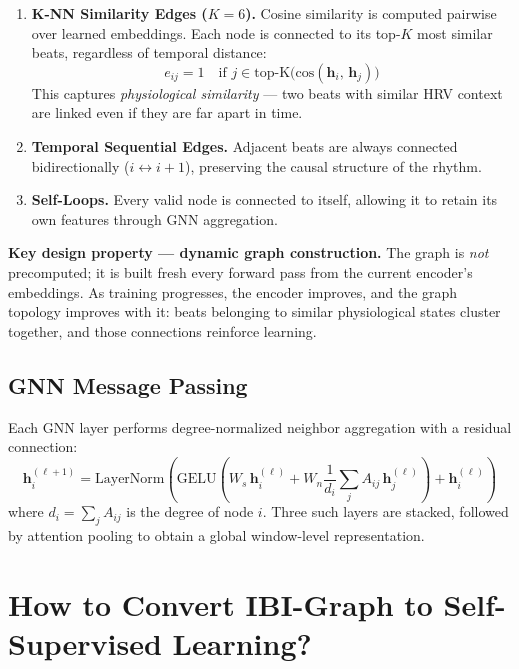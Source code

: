 \documentclass[11pt,a4paper]{article}
\begin{document}
\begin{enumerate}[leftmargin=*]

\item \textbf{K-NN Similarity Edges ($K=6$).}
Cosine similarity is computed pairwise over learned embeddings.
Each node is connected to its top-$K$ most similar beats, regardless of temporal distance:
\[
    e_{ij} = 1 \quad \text{if } j \in \mathrm{top\text{-}K}\bigl(\mathrm{cos}(\mathbf{h}_i,\, \mathbf{h}_j)\bigr)
\]
This captures \emph{physiological similarity} --- two beats with similar HRV context are linked
even if they are far apart in time.

\item \textbf{Temporal Sequential Edges.}
Adjacent beats are always connected bidirectionally ($i \leftrightarrow i{+}1$),
preserving the causal structure of the rhythm.

\item \textbf{Self-Loops.}
Every valid node is connected to itself, allowing it to retain its own features through GNN aggregation.

\end{enumerate}

\textbf{Key design property --- dynamic graph construction.}
The graph is \emph{not} precomputed; it is built fresh every forward pass from the current encoder's embeddings.
As training progresses, the encoder improves, and the graph topology improves with it:
beats belonging to similar physiological states cluster together, and those connections reinforce learning.

\subsection{GNN Message Passing}

Each GNN layer performs degree-normalized neighbor aggregation with a residual connection:
\[
    \mathbf{h}_i^{(\ell+1)} = \mathrm{LayerNorm}\!\left(
        \mathrm{GELU}\!\left(
            W_s\,\mathbf{h}_i^{(\ell)}
            + W_n \frac{1}{d_i}\sum_{j} A_{ij}\,\mathbf{h}_j^{(\ell)}
        \right)
        + \mathbf{h}_i^{(\ell)}
    \right)
\]
where $d_i = \sum_j A_{ij}$ is the degree of node $i$.
Three such layers are stacked, followed by attention pooling to obtain a global window-level representation.

\section{How to Convert IBI-Graph to Self-Supervised Learning?}
\end{document}
